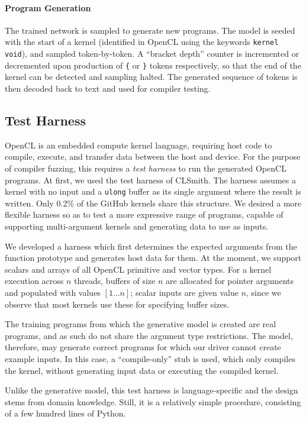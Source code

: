 \paragraph{Program Generation} The trained network is sampled to generate new programs. The model is seeded with the start of a kernel (identified in OpenCL using the keywords \texttt{kernel void}), and sampled token-by-token. A ``bracket depth'' counter is incremented or decremented upon production of \texttt{\{} or \texttt{\}} tokens respectively, so that the end of the kernel can be detected and sampling halted. The generated sequence of tokens is then decoded back to text and used for compiler testing.


\subsection{Test Harness\label{sec:test-harness}}

OpenCL is an embedded compute kernel language, requiring host code to compile, execute, and transfer data between the host and device. For the purpose of compiler fuzzing, this requires a \emph{test harness} to run the generated OpenCL programs. At first, we used the test harness of CLSmith. The harness assumes a kernel with no input and a \texttt{ulong} buffer as its single argument where the result is written. Only 0.2\% of the GitHub kernels share this structure. We desired a more flexible harness so as to test a more expressive range of programs, capable of supporting multi-argument kernels and generating data to use as inputs.

We developed a harness which first determines the expected arguments from the function prototype and generates host data for them. At the moment, we support scalars and arrays of all OpenCL primitive and vector types. For a kernel execution across $n$ threads, buffers of size $n$ are allocated for pointer arguments and populated with values {$[1 \ldots n]$}; scalar inputs are given value $n$, since we observe that most kernels use these for specifying buffer sizes.

The training programs from which the generative model is created are real programs, and as such do not share the argument type restrictions. The model, therefore, may generate correct programs for which our driver cannot create example inputs. In this case, a ``compile-only'' stub is used, which only compiles the kernel, without generating input data or executing the compiled kernel.

Unlike the generative model, this test harness is language-specific and the design stems from domain knowledge. Still, it is a relatively simple procedure, consisting of a few hundred lines of Python.

